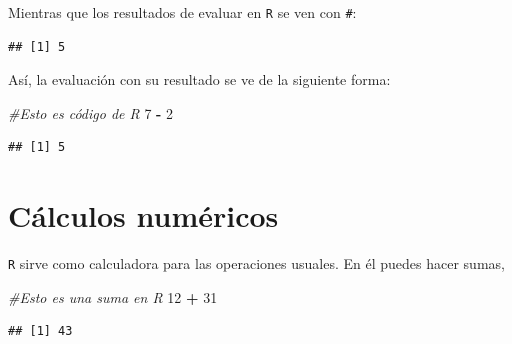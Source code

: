 \documentclass[
]{book}
\newenvironment{Shaded}{\begin{snugshade}}{\end{snugshade}}
\newcommand{\CommentTok}[1]{\textcolor[rgb]{0.56,0.35,0.01}{\textit{#1}}}
\newcommand{\DecValTok}[1]{\textcolor[rgb]{0.00,0.00,0.81}{#1}}
\newcommand{\OperatorTok}[1]{\textcolor[rgb]{0.81,0.36,0.00}{\textbf{#1}}}
\newcommand{\StringTok}[1]{\textcolor[rgb]{0.31,0.60,0.02}{#1}}
\begin{document}
Mientras que los resultados de evaluar en \texttt{R} se ven con \texttt{\#}:

\begin{verbatim}
## [1] 5
\end{verbatim}

Así, la evaluación con su resultado se ve de la siguiente forma:

\begin{Shaded}
\begin{Highlighting}[]
\CommentTok{#Esto es código de R}
\DecValTok{7} \OperatorTok{-}\StringTok{ }\DecValTok{2}
\end{Highlighting}
\end{Shaded}

\begin{verbatim}
## [1] 5
\end{verbatim}

\hypertarget{cuxe1lculos-numuxe9ricos}{%
\section{Cálculos numéricos}\label{cuxe1lculos-numuxe9ricos}}

\texttt{R} sirve como calculadora para las operaciones usuales. En él puedes hacer sumas,

\begin{Shaded}
\begin{Highlighting}[]
\CommentTok{#Esto es una suma en R}
\DecValTok{12} \OperatorTok{+}\StringTok{ }\DecValTok{31}
\end{Highlighting}
\end{Shaded}

\begin{verbatim}
## [1] 43
\end{verbatim}
\end{document}
